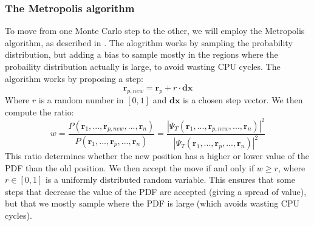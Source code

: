 \documentclass[a4paper, 10pt]{article}
\begin{document}
	\subsubsection{The Metropolis algorithm}
	To move from one Monte Carlo step to the other, we will employ the Metropolis algorithm, as described in \cite{Hjorth-Jensen2015}. The alogrithm works by sampling the probability distribution, but adding a bias to sample mostly in the regions where the probaility distribution actually is large, to avoid wasting CPU cycles. The algorithm works by proposing a step:
	\begin{equation}
	\boldsymbol{r}_{p, new}=\boldsymbol{r}_p+r \cdot \boldsymbol{dx}
	\end{equation}
	Where $r$ is a random number in $[0,1]$ and $\boldsymbol{dx}$ is a chosen step vector. We then compute the ratio:
	\begin{equation}
	w=\frac{P(\boldsymbol{r}_1, ..., \boldsymbol{r}_{p,new}, ..., \boldsymbol{r}_n)}{P(\boldsymbol{r}_1, ..., \boldsymbol{r}_{p}, ..., \boldsymbol{r}_n)}=\frac{|\Psi_T(\boldsymbol{r}_1, ..., \boldsymbol{r}_{p,new}, ..., \boldsymbol{r}_n)|^2}{|\Psi_T(\boldsymbol{r}_1, ..., \boldsymbol{r}_{p}, ..., \boldsymbol{r}_n)|^2}
	\end{equation}
	This ratio determines whether the new position has a higher or lower value of the PDF than the old position. We then accept the move if and only if $w\geq r$, where $r\in [0,1]$ is a uniformly distributed random variable. This ensures that some steps that decrease the value of the PDF are accepted (giving a spread of value), but that we mostly sample where the PDF is large (which avoids wasting CPU cycles).
\end{document}
